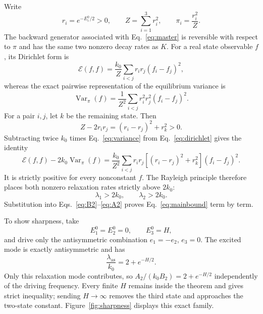 \documentclass[11pt,a4paper]{article}
\DeclareMathOperator{\Var}{Var}
\begin{document}
Write
\begin{equation}
 r_i=e^{-E_i^0/2}>0,\qquad Z=\sum_{i=1}^3r_i^2,
 \qquad \pi_i=\frac{r_i^2}{Z}.
\end{equation}
The backward generator associated with Eq.~\eqref{eq:master} is reversible with respect
to $\pi$ and has the same two nonzero decay rates as $K$. For a real state observable
$f$, its Dirichlet form is
\begin{equation}
 \mathcal E(f,f)=\frac{k_0}{Z}\sum_{i<j}r_ir_j(f_i-f_j)^2,
 \label{eq:dirichlet}
\end{equation}
whereas the exact pairwise representation of the equilibrium variance is
\begin{equation}
 \Var_\pi(f)=\frac{1}{Z^2}\sum_{i<j}r_i^2r_j^2(f_i-f_j)^2.
 \label{eq:variance}
\end{equation}
For a pair $i,j$, let $k$ be the remaining state. Then
\begin{equation}
 Z-2r_ir_j=(r_i-r_j)^2+r_k^2>0.
 \label{eq:pairmargin}
\end{equation}
Subtracting twice $k_0$ times Eq.~\eqref{eq:variance} from
Eq.~\eqref{eq:dirichlet} gives the identity
\begin{equation}
 \mathcal E(f,f)-2k_0\Var_\pi(f)
 =\frac{k_0}{Z^2}\sum_{i<j}r_ir_j
 \left[(r_i-r_j)^2+r_k^2\right](f_i-f_j)^2.
 \label{eq:strictidentity}
\end{equation}
It is strictly positive for every nonconstant $f$. The Rayleigh principle therefore
places both nonzero relaxation rates strictly above $2k_0$:
\begin{equation}
 \lambda_1>2k_0,\qquad \lambda_2>2k_0.
 \label{eq:spectralgap}
\end{equation}
Substitution into Eqs.~\eqref{eq:B2}--\eqref{eq:A2} proves
Eq.~\eqref{eq:mainbound} term by term.

To show sharpness, take
\begin{equation}
 E_1^0=E_2^0=0,\qquad E_3^0=H,
\end{equation}
and drive only the antisymmetric combination $e_1=-e_2$, $e_3=0$. The excited mode is
exactly antisymmetric and has
\begin{equation}
 \frac{\lambda_{\mathrm{as}}}{k_0}=2+e^{-H/2}.
 \label{eq:sharpfamily}
\end{equation}
Only this relaxation mode contributes, so $A_2/(k_0B_2)=2+e^{-H/2}$ independently of
the driving frequency. Every finite $H$ remains inside the theorem and gives strict
inequality; sending $H\to\infty$ removes the third state and approaches the two-state
constant. Figure~\ref{fig:sharpness} displays this exact family.
\end{document}
